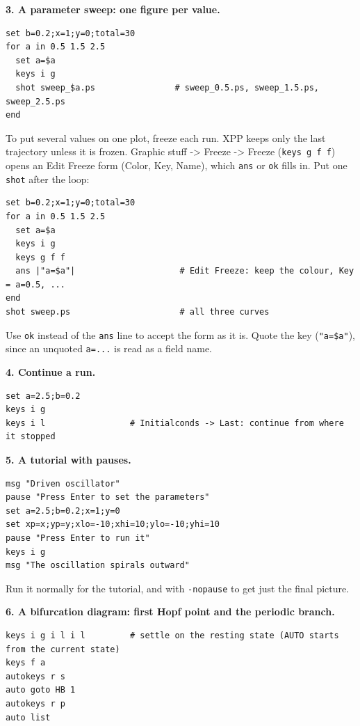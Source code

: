 \documentclass{article}
\begin{document}
\textbf{3. A parameter sweep: one figure per value.}

{\small\begin{verbatim}
set b=0.2;x=1;y=0;total=30
for a in 0.5 1.5 2.5
  set a=$a
  keys i g
  shot sweep_$a.ps                # sweep_0.5.ps, sweep_1.5.ps, sweep_2.5.ps
end
\end{verbatim}}

To put several values on one plot, freeze each run. XPP keeps only the
last trajectory unless it is frozen. Graphic stuff -\textgreater{} Freeze -\textgreater{} Freeze
(\texttt{keys\ g\ f\ f}) opens an Edit Freeze form (Color, Key, Name), which
\texttt{ans} or \texttt{ok} fills in. Put one \texttt{shot} after
the loop:

{\small\begin{verbatim}
set b=0.2;x=1;y=0;total=30
for a in 0.5 1.5 2.5
  set a=$a
  keys i g
  keys g f f
  ans |"a=$a"|                     # Edit Freeze: keep the colour, Key = a=0.5, ...
end
shot sweep.ps                      # all three curves
\end{verbatim}}

Use \texttt{ok} instead of the \texttt{ans} line to accept the
form as it is. Quote the key (\texttt{"a=\$a"}), since an unquoted
\texttt{a=...} is read as a field name.

\textbf{4. Continue a run.}

{\small\begin{verbatim}
set a=2.5;b=0.2
keys i g
keys i l                 # Initialconds -> Last: continue from where it stopped
\end{verbatim}}

\textbf{5. A tutorial with pauses.}

{\small\begin{verbatim}
msg "Driven oscillator"
pause "Press Enter to set the parameters"
set a=2.5;b=0.2;x=1;y=0
set xp=x;yp=y;xlo=-10;xhi=10;ylo=-10;yhi=10
pause "Press Enter to run it"
keys i g
msg "The oscillation spirals outward"
\end{verbatim}}

Run it normally for the tutorial, and with \texttt{-nopause} to
get just the final picture.

\textbf{6. A bifurcation diagram: first Hopf point and the periodic
branch.}

{\small\begin{verbatim}
keys i g i l i l         # settle on the resting state (AUTO starts from the current state)
keys f a
autokeys r s
auto goto HB 1
autokeys r p
auto list
\end{verbatim}}
\end{document}

